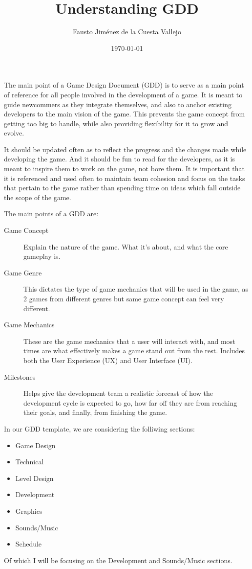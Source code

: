 \documentclass{article}
\title{Understanding GDD}
\author{Fausto Jiménez de la Cuesta Vallejo}
\date{\today}
\begin{document}
\maketitle

The main point of a Game Design Document (GDD) is to serve as a main point of 
reference for all people involved in the development of a game. It is meant to 
guide newcommers as they integrate themselves, and also to anchor existing 
developers to the main vision of the game. This prevents the game concept from 
getting too big to handle, while also providing flexibility for it to grow and
evolve.

It should be updated often as to reflect the progress and the changes made 
while developing the game. And it should be fun to read for the developers, 
as it is meant to inspire them to work on the game, not bore them. It is 
important that it is referenced and used often to maintain team cohesion and 
focus on the tasks that pertain to the game rather than spending time on ideas 
which fall outside the scope of the game.

The main points of a GDD are:

\begin{description}
    \item[Game Concept] Explain the nature of the game. What it's about, and 
        what the core gameplay is.
    \item[Game Genre] This dictates the type of game mechanics that will be 
        used in the game, as 2 games from different genres but same game 
        concept can feel very different.
    \item[Game Mechanics] These are the game mechanics that a user will 
        interact with, and most times are what effectively makes a game stand 
        out from the rest. Includes both the User Experience (UX) and 
        User Interface (UI).
    \item[Milestones] Helps give the development team a realistic forecast of 
        how the development cycle is expected to go, how far off they are from 
        reaching their goals, and finally, from finishing the game.
\end{description}

In our GDD template, we are considering the folliwing sections:

\begin{itemize}
    \item Game Design
    \item Technical
    \item Level Design
    \item Development
    \item Graphics
    \item Sounds/Music
    \item Schedule
\end{itemize}

Of which I will be focusing on the Development and Sounds/Music sections.
\end{document}
